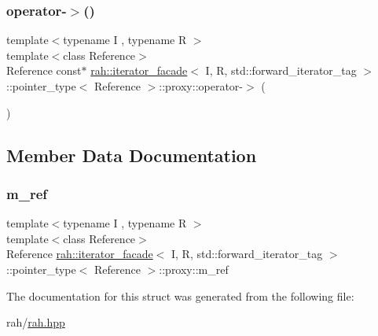 \subsubsection{\texorpdfstring{operator-\/$>$()}{operator->()}}
{\footnotesize\ttfamily template$<$typename I , typename R $>$ \\
template$<$class Reference$>$ \\
Reference const$\ast$ \mbox{\hyperlink{structrah_1_1iterator__facade}{rah\+::iterator\+\_\+facade}}$<$ I, R, std\+::forward\+\_\+iterator\+\_\+tag $>$\+::pointer\+\_\+type$<$ Reference $>$\+::proxy\+::operator-\/$>$ (\begin{DoxyParamCaption}{ }\end{DoxyParamCaption})\hspace{0.3cm}{\ttfamily [inline]}}



\subsection{Member Data Documentation}
\mbox{\label{structrah_1_1iterator__facade_3_01_i_00_01_r_00_01std_1_1forward__iterator__tag_01_4_1_1pointer__type_1_1proxy_a5312ff831890ba9940f5aac7f84ecbae}} 
\subsubsection{\texorpdfstring{m\_ref}{m\_ref}}
{\footnotesize\ttfamily template$<$typename I , typename R $>$ \\
template$<$class Reference$>$ \\
Reference \mbox{\hyperlink{structrah_1_1iterator__facade}{rah\+::iterator\+\_\+facade}}$<$ I, R, std\+::forward\+\_\+iterator\+\_\+tag $>$\+::pointer\+\_\+type$<$ Reference $>$\+::proxy\+::m\+\_\+ref}



The documentation for this struct was generated from the following file\+:\begin{DoxyCompactItemize}
\item 
rah/\mbox{\hyperlink{rah_8hpp}{rah.\+hpp}}\end{DoxyCompactItemize}

